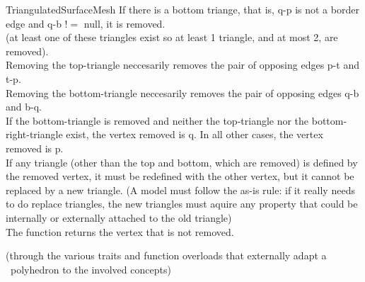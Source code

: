 \begin{ccRefConcept}{TriangulatedSurfaceMesh}
{  If there is a bottom triange, that is, q-p is not a border edge and q-b $!=$ null, it is removed.\\
  (at least one of these triangles exist so at least 1 triangle, and at most 2, are removed).\\
%  
  Removing the top-triangle neccesarily removes the pair of opposing edges p-t and t-p.\\
  Removing the bottom-triangle neccesarily removes the pair of opposing edges q-b and b-q.\\
%      
  If the bottom-triangle is removed and neither the top-triangle nor
  the bottom-right-triangle exist, the vertex removed is q. In all other
  cases, the vertex removed is p.\\
  If any triangle (other than the top and bottom, which are removed) is defined by
  the removed vertex, it must be redefined with the other vertex, but it cannot
  be replaced by a new triangle. (A model must follow the as-is rule: if it really
  needs to do replace triangles, the new triangles must aquire any property 
  that could be internally or externally attached to the old triangle)\\
  The function returns the vertex that is not removed.}

\ccHasModels
{}
  (through the various traits and function overloads that externally adapt a \cgal\
  polyhedron to the involved concepts)

\end{ccRefConcept}

